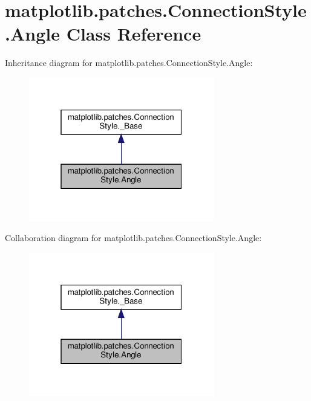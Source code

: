 \hypertarget{classmatplotlib_1_1patches_1_1ConnectionStyle_1_1Angle}{}\section{matplotlib.\+patches.\+Connection\+Style.\+Angle Class Reference}
\label{classmatplotlib_1_1patches_1_1ConnectionStyle_1_1Angle}


Inheritance diagram for matplotlib.\+patches.\+Connection\+Style.\+Angle\+:
\nopagebreak
\begin{figure}[H]
\begin{center}
\leavevmode
\includegraphics[width=229pt]{classmatplotlib_1_1patches_1_1ConnectionStyle_1_1Angle__inherit__graph}
\end{center}
\end{figure}


Collaboration diagram for matplotlib.\+patches.\+Connection\+Style.\+Angle\+:
\nopagebreak
\begin{figure}[H]
\begin{center}
\leavevmode
\includegraphics[width=229pt]{classmatplotlib_1_1patches_1_1ConnectionStyle_1_1Angle__coll__graph}
\end{center}
\end{figure}
